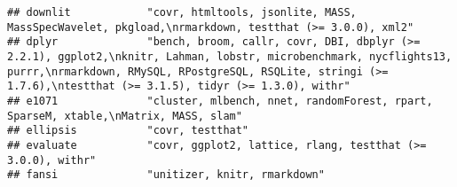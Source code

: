 \documentclass[
]{article}
\begin{document}
\begin{verbatim}
## downlit            "covr, htmltools, jsonlite, MASS, MassSpecWavelet, pkgload,\nrmarkdown, testthat (>= 3.0.0), xml2"                                                                                                                                                                                                                                                                                                                                                                                
## dplyr              "bench, broom, callr, covr, DBI, dbplyr (>= 2.2.1), ggplot2,\nknitr, Lahman, lobstr, microbenchmark, nycflights13, purrr,\nrmarkdown, RMySQL, RPostgreSQL, RSQLite, stringi (>= 1.7.6),\ntestthat (>= 3.1.5), tidyr (>= 1.3.0), withr"                                                                                                                                                                                                                                            
## e1071              "cluster, mlbench, nnet, randomForest, rpart, SparseM, xtable,\nMatrix, MASS, slam"                                                                                                                                                                                                                                                                                                                                                                                               
## ellipsis           "covr, testthat"                                                                                                                                                                                                                                                                                                                                                                                                                                                                  
## evaluate           "covr, ggplot2, lattice, rlang, testthat (>= 3.0.0), withr"                                                                                                                                                                                                                                                                                                                                                                                                                       
## fansi              "unitizer, knitr, rmarkdown"                                                                                                                                                                                                                                                                                                                                                                                                                                                      

\end{verbatim}
\end{document}
